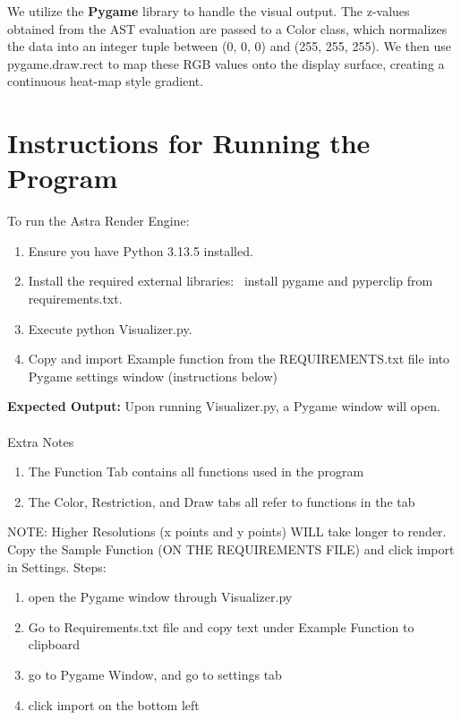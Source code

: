 \documentclass{article}
\begin{document}
We utilize the \textbf{Pygame} library to handle the visual output. The z-values obtained from the AST evaluation are passed to a Color class, which normalizes the data into an integer tuple between (0, 0, 0) and (255, 255, 255). We then use pygame.draw.rect to map these RGB values onto the display surface, creating a continuous heat-map style gradient. 

\section{\textbf{Instructions for Running the Program}}

To run the Astra Render Engine:

\begin{enumerate}
    \item Ensure you have Python 3.13.5 installed.
    \item Install the required external libraries:  install pygame and pyperclip from requirements.txt.
    \item Execute python Visualizer.py.
    \item Copy and import Example function from the REQUIREMENTS.txt file into Pygame settings window (instructions below)
\end{enumerate}
\textbf{Expected Output:} Upon running Visualizer.py, a Pygame window will open. 
\\\\Extra Notes
\begin{enumerate}
    \item{The Function Tab contains all functions used in the program}
    \item{The Color, Restriction, and Draw tabs all refer to functions in the tab}
\end{enumerate}
NOTE: Higher Resolutions (x points and y points) WILL take longer to render.
\\Copy the Sample Function (ON THE REQUIREMENTS FILE) and click import in Settings. Steps:
\begin{enumerate}
    \item open the Pygame window through Visualizer.py
    \item Go to Requirements.txt file and copy text under Example Function to clipboard
    \item go to Pygame Window, and go to settings tab
    \item click import on the bottom left
\end{enumerate}
\end{document}
